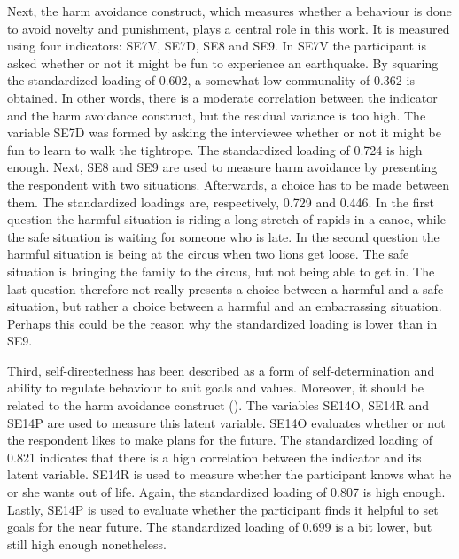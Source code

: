 \documentclass[11pt]{article}
\begin{document}

Next, the harm avoidance construct, which measures whether a behaviour is done
to avoid novelty and punishment, plays a central role in this work. It is
measured using four indicators: SE7V, SE7D, SE8 and SE9. In SE7V the participant
is asked whether or not it might be fun to experience an earthquake. By squaring
the standardized loading of 0.602, a somewhat low communality of 0.362 is
obtained. In other words, there is a moderate correlation between the indicator
and the harm avoidance construct, but the residual variance is too high. The
variable SE7D was formed by asking the interviewee whether or not it might be
fun to learn to walk the tightrope. The standardized loading of 0.724 is high enough.
Next, SE8 and SE9 are used to measure harm avoidance by presenting the respondent
with two situations. Afterwards, a choice has to be made between them. The
standardized loadings are, respectively, 0.729 and 0.446. In the first question
the harmful situation is riding a long stretch of rapids in a canoe, while the
safe situation is waiting for someone who is late. In the second question the
harmful situation is being at the circus when two lions get loose. The safe
situation is bringing the family to the circus, but not being able to get in.
The last question therefore not really presents a choice between a harmful and
a safe situation, but rather a choice between a harmful and an embarrassing
situation. Perhaps this could be the reason why the standardized loading is
lower than in SE9.


Third, self-directedness has been described as a form of self-determination and
ability to regulate behaviour to suit goals and values. Moreover, it should be
related to the harm avoidance construct (\cite{tse2011}).
The variables SE14O, SE14R and SE14P are used to measure this latent variable.
SE14O evaluates whether or not the respondent likes to make plans for the future.
The standardized loading of 0.821 indicates that there is a high correlation
between the indicator and its latent variable. SE14R is used to measure whether
the participant knows what he or she wants out of life. Again, the standardized
loading of 0.807 is high enough. Lastly, SE14P is used to evaluate whether the
participant finds it helpful to set goals for the near future. The standardized
loading of 0.699 is a bit lower, but still high enough nonetheless.
\end{document}

